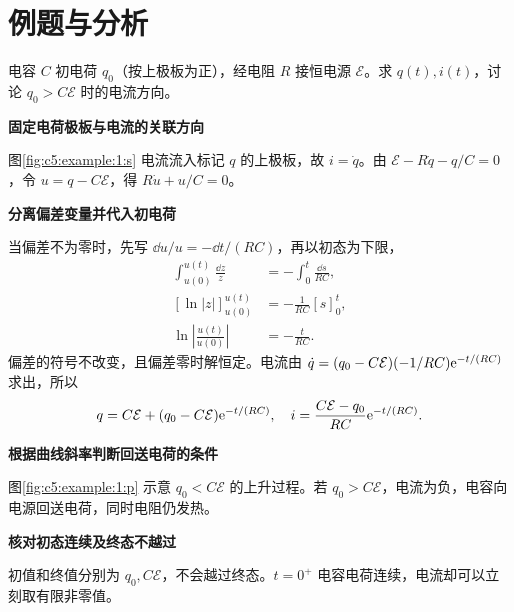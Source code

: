 \section{例题与分析}

\begin{question}\begin{example}[带初电荷的RC充电]\label{c5:example:1}
电容 $C$ 初电荷 $q_0$（按上极板为正），经电阻 $R$ 接恒电源 $\mathcal E$。求 $q(t),i(t)$，讨论 $q_0>C\mathcal E$ 时的电流方向。
\end{example}
\end{question}
\begin{solution}\textbf{固定电荷极板与电流的关联方向}\par\nobreak
图\ref{fig:c5:example:1:s} 电流流入标记 $q$ 的上极板，故 $i=\dot q$。由 $\mathcal E-R\dot q-q/C=0$，令 $u=q-C\mathcal E$，得 $R\dot u+u/C=0$。

\par\medskip{}\noindent\textbf{分离偏差变量并代入初电荷}\par\nobreak
当偏差不为零时，先写 $\dd u/u=-\dd t/(RC)$，再以初态为下限，
\[
\begin{aligned}
\int_{u(0)}^{u(t)}\frac{\dd z}{z}&=-\int_0^t\frac{\dd s}{RC},\\
[\ln|z|]_{u(0)}^{u(t)}&=-\frac1{RC}[s]_0^t,\\
\ln\left|\frac{u(t)}{u(0)}\right|&=-\frac t{RC}.
\end{aligned}
\]
偏差的符号不改变，且偏差零时解恒定。电流由
$\dot q=(q_0-C\mathcal E)(-1/RC)\mathrm e^{-t/(RC)}$ 求出，所以
\[
 q=C\mathcal E+(q_0-C\mathcal E)\mathrm e^{-t/(RC)},\quad
 i=\frac{C\mathcal E-q_0}{RC}\mathrm e^{-t/(RC)}.
\]



\par\medskip{}\noindent\textbf{根据曲线斜率判断回送电荷的条件}\par\nobreak
图\ref{fig:c5:example:1:p} 示意 $q_0<C\mathcal E$ 的上升过程。若 $q_0>C\mathcal E$，电流为负，电容向电源回送电荷，同时电阻仍发热。

\par\medskip{}\noindent\textbf{核对初态连续及终态不越过}\par\nobreak
初值和终值分别为 $q_0,C\mathcal E$，不会越过终态。$t=0^+$ 电容电荷连续，电流却可以立刻取有限非零值。\end{solution}
